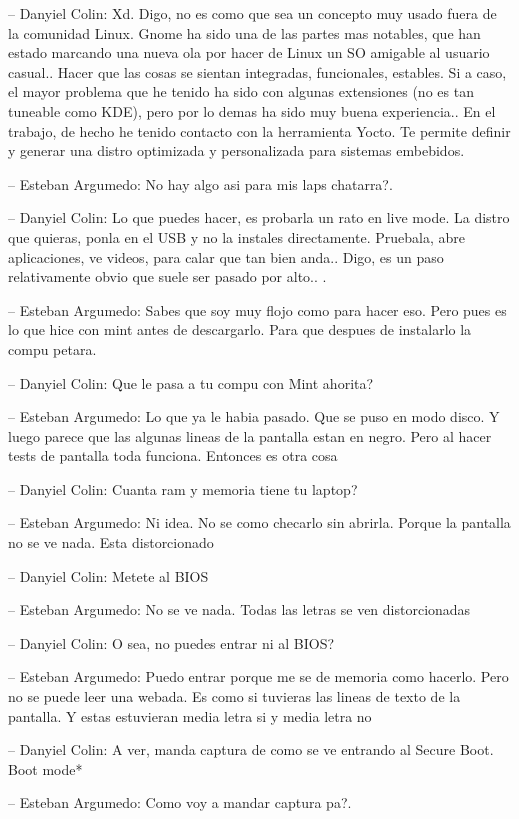 -- Danyiel Colin: Xd. Digo, no es como que sea un concepto muy usado
fuera de la comunidad Linux. Gnome ha sido una de las partes mas
notables, que han estado marcando una nueva ola por hacer de Linux un SO
amigable al usuario casual.. Hacer que las cosas se sientan integradas,
funcionales, estables. Si a caso, el mayor problema que he tenido ha
sido con algunas extensiones (no es tan tuneable como KDE), pero por lo
demas ha sido muy buena experiencia.. En el trabajo, de hecho he tenido
contacto con la herramienta Yocto. Te permite definir y generar una
distro optimizada y personalizada para sistemas embebidos.

-- Esteban Argumedo: No hay algo asi para mis laps chatarra?.

-- Danyiel Colin: Lo que puedes hacer, es probarla un rato en live mode.
La distro que quieras, ponla en el USB y no la instales directamente.
Pruebala, abre aplicaciones, ve videos, para calar que tan bien anda..
Digo, es un paso relativamente obvio que suele ser pasado por alto.. .

-- Esteban Argumedo: Sabes que soy muy flojo como para hacer eso. Pero
pues es lo que hice con mint antes de descargarlo. Para que despues de
instalarlo la compu petara.

-- Danyiel Colin: Que le pasa a tu compu con Mint ahorita?

-- Esteban Argumedo: Lo que ya le habia pasado. Que se puso en modo
disco. Y luego parece que las algunas lineas de la pantalla estan en
negro. Pero al hacer tests de pantalla toda funciona. Entonces es otra
cosa

-- Danyiel Colin: Cuanta ram y memoria tiene tu laptop?

-- Esteban Argumedo: Ni idea. No se como checarlo sin abrirla. Porque la
pantalla no se ve nada. Esta distorcionado

-- Danyiel Colin: Metete al BIOS

-- Esteban Argumedo: No se ve nada. Todas las letras se ven
distorcionadas

-- Danyiel Colin: O sea, no puedes entrar ni al BIOS?

-- Esteban Argumedo: Puedo entrar porque me se de memoria como hacerlo.
Pero no se puede leer una webada. Es como si tuvieras las lineas de
texto de la pantalla. Y estas estuvieran media letra si y media letra no

-- Danyiel Colin: A ver, manda captura de como se ve entrando al Secure
Boot. Boot mode*

-- Esteban Argumedo: Como voy a mandar captura pa?.

